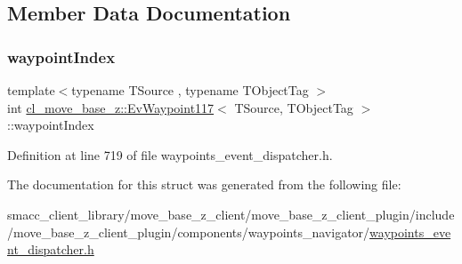 \subsection{Member Data Documentation}
\mbox{\label{structcl__move__base__z_1_1EvWaypoint117_aed213fa72d6a82c25d55c70bcc0dee37}} 
\subsubsection{\texorpdfstring{waypoint\+Index}{waypointIndex}}
{\footnotesize\ttfamily template$<$typename T\+Source , typename T\+Object\+Tag $>$ \\
int \hyperlink{structcl__move__base__z_1_1EvWaypoint117}{cl\+\_\+move\+\_\+base\+\_\+z\+::\+Ev\+Waypoint117}$<$ T\+Source, T\+Object\+Tag $>$\+::waypoint\+Index}



Definition at line 719 of file waypoints\+\_\+event\+\_\+dispatcher.\+h.



The documentation for this struct was generated from the following file\+:\begin{DoxyCompactItemize}
\item 
smacc\+\_\+client\+\_\+library/move\+\_\+base\+\_\+z\+\_\+client/move\+\_\+base\+\_\+z\+\_\+client\+\_\+plugin/include/move\+\_\+base\+\_\+z\+\_\+client\+\_\+plugin/components/waypoints\+\_\+navigator/\hyperlink{waypoints__event__dispatcher_8h}{waypoints\+\_\+event\+\_\+dispatcher.\+h}\end{DoxyCompactItemize}
